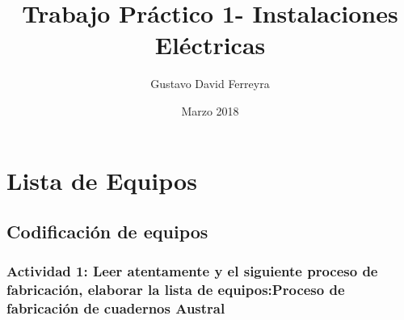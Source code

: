 \documentclass[a4paper]{article}
\title{Trabajo Práctico 1- Instalaciones Eléctricas}
\author{Gustavo David Ferreyra }
\date{Marzo 2018}
\begin{document}
\fancyhead[C]{}
\fancyfoot[C]{}
\fancyfoot[R]{}
\pagestyle{fancy} 
\section{Lista de Equipos}
\subsection{Codificación de equipos}
\subsubsection{Actividad 1: Leer atentamente y el siguiente proceso de fabricación, elaborar la lista de equipos:Proceso de fabricación de cuadernos Austral}
\end{document}
